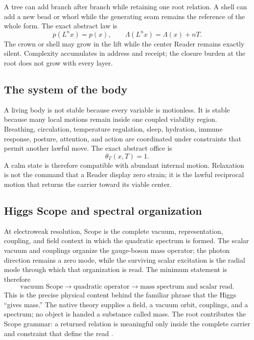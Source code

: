 \documentclass[11pt]{article}
\begin{document}
A tree can add branch after branch while retaining one root relation. A shell can add a new bead or whorl while the generating seam remains the reference of the whole form. The exact abstract law is
\[
p(L^nx)=p(x),
\qquad
\Lambda(L^nx)=\Lambda(x)+nT.
\]
The crown or shell may grow in the lift while the center Reader remains exactly silent. Complexity accumulates in address and receipt; the closure burden at the root does not grow with every layer.

\subsection{The system of the body}

A living body is not stable because every variable is motionless. It is stable because many local motions remain inside one coupled viability region. Breathing, circulation, temperature regulation, sleep, hydration, immune response, posture, attention, and action are coordinated under constraints that permit another lawful move. The exact abstract office is
\[
\theta_\Gamma(x,T)=1.
\]
A calm state is therefore compatible with abundant internal motion. Relaxation is not the command that a Reader display zero strain; it is the lawful reciprocal motion that returns the carrier toward its viable center.

\subsection{Higgs Scope and spectral organization}

At electroweak resolution, Scope is the complete vacuum, representation, coupling, and field context in which the quadratic spectrum is formed. The scalar vacuum and couplings organize the gauge-boson mass operator; the photon direction remains a zero mode, while the surviving scalar excitation is the radial mode through which that organization is read. The minimum statement is therefore
\[
\boxed{
\text{vacuum Scope}
\longrightarrow
\text{quadratic operator}
\longrightarrow
\text{mass spectrum and scalar read}.
}
\]
This is the precise physical content behind the familiar phrase that the Higgs ``gives mass.'' The native theory supplies a field, a vacuum orbit, couplings, and a spectrum; no object is handed a substance called mass. The root contributes the Scope grammar: a returned relation is meaningful only inside the complete carrier and constraint that define the read \cite{Higgs1964,Weinberg1967,CoppaQFTSM2026}.
\end{document}

